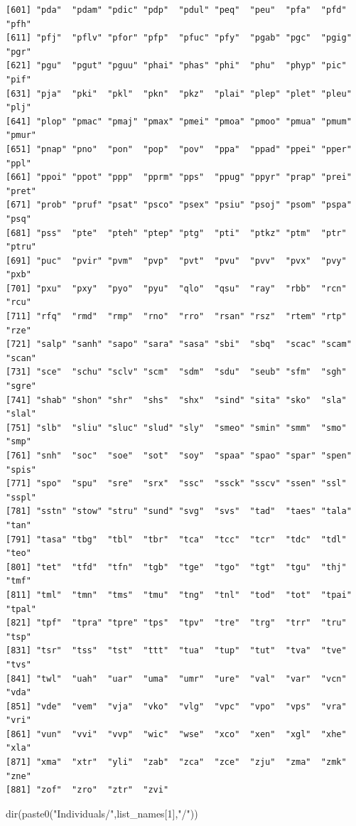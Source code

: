 \documentclass[
  letterpaper,
  DIV=11,
  numbers=noendperiod]{scrreprt}
\newenvironment{Shaded}{\begin{snugshade}}{\end{snugshade}}
\newcommand{\DecValTok}[1]{\textcolor[rgb]{0.68,0.00,0.00}{#1}}
\newcommand{\FunctionTok}[1]{\textcolor[rgb]{0.28,0.35,0.67}{#1}}
\newcommand{\NormalTok}[1]{\textcolor[rgb]{0.00,0.23,0.31}{#1}}
\newcommand{\StringTok}[1]{\textcolor[rgb]{0.13,0.47,0.30}{#1}}
\begin{document}
\begin{verbatim}
[601] "pda"  "pdam" "pdic" "pdp"  "pdul" "peq"  "peu"  "pfa"  "pfd"  "pfh" 
[611] "pfj"  "pflv" "pfor" "pfp"  "pfuc" "pfy"  "pgab" "pgc"  "pgig" "pgr" 
[621] "pgu"  "pgut" "pguu" "phai" "phas" "phi"  "phu"  "phyp" "pic"  "pif" 
[631] "pja"  "pki"  "pkl"  "pkn"  "pkz"  "plai" "plep" "plet" "pleu" "plj" 
[641] "plop" "pmac" "pmaj" "pmax" "pmei" "pmoa" "pmoo" "pmua" "pmum" "pmur"
[651] "pnap" "pno"  "pon"  "pop"  "pov"  "ppa"  "ppad" "ppei" "pper" "ppl" 
[661] "ppoi" "ppot" "ppp"  "pprm" "pps"  "ppug" "ppyr" "prap" "prei" "pret"
[671] "prob" "pruf" "psat" "psco" "psex" "psiu" "psoj" "psom" "pspa" "psq" 
[681] "pss"  "pte"  "pteh" "ptep" "ptg"  "pti"  "ptkz" "ptm"  "ptr"  "ptru"
[691] "puc"  "pvir" "pvm"  "pvp"  "pvt"  "pvu"  "pvv"  "pvx"  "pvy"  "pxb" 
[701] "pxu"  "pxy"  "pyo"  "pyu"  "qlo"  "qsu"  "ray"  "rbb"  "rcn"  "rcu" 
[711] "rfq"  "rmd"  "rmp"  "rno"  "rro"  "rsan" "rsz"  "rtem" "rtp"  "rze" 
[721] "salp" "sanh" "sapo" "sara" "sasa" "sbi"  "sbq"  "scac" "scam" "scan"
[731] "sce"  "schu" "sclv" "scm"  "sdm"  "sdu"  "seub" "sfm"  "sgh"  "sgre"
[741] "shab" "shon" "shr"  "shs"  "shx"  "sind" "sita" "sko"  "sla"  "slal"
[751] "slb"  "sliu" "sluc" "slud" "sly"  "smeo" "smin" "smm"  "smo"  "smp" 
[761] "snh"  "soc"  "soe"  "sot"  "soy"  "spaa" "spao" "spar" "spen" "spis"
[771] "spo"  "spu"  "sre"  "srx"  "ssc"  "ssck" "sscv" "ssen" "ssl"  "sspl"
[781] "sstn" "stow" "stru" "sund" "svg"  "svs"  "tad"  "taes" "tala" "tan" 
[791] "tasa" "tbg"  "tbl"  "tbr"  "tca"  "tcc"  "tcr"  "tdc"  "tdl"  "teo" 
[801] "tet"  "tfd"  "tfn"  "tgb"  "tge"  "tgo"  "tgt"  "tgu"  "thj"  "tmf" 
[811] "tml"  "tmn"  "tms"  "tmu"  "tng"  "tnl"  "tod"  "tot"  "tpai" "tpal"
[821] "tpf"  "tpra" "tpre" "tps"  "tpv"  "tre"  "trg"  "trr"  "tru"  "tsp" 
[831] "tsr"  "tss"  "tst"  "ttt"  "tua"  "tup"  "tut"  "tva"  "tve"  "tvs" 
[841] "twl"  "uah"  "uar"  "uma"  "umr"  "ure"  "val"  "var"  "vcn"  "vda" 
[851] "vde"  "vem"  "vja"  "vko"  "vlg"  "vpc"  "vpo"  "vps"  "vra"  "vri" 
[861] "vun"  "vvi"  "vvp"  "wic"  "wse"  "xco"  "xen"  "xgl"  "xhe"  "xla" 
[871] "xma"  "xtr"  "yli"  "zab"  "zca"  "zce"  "zju"  "zma"  "zmk"  "zne" 
[881] "zof"  "zro"  "ztr"  "zvi" 
\end{verbatim}

\begin{Shaded}
\begin{Highlighting}[]
\FunctionTok{dir}\NormalTok{(}\FunctionTok{paste0}\NormalTok{(}\StringTok{"Individuals/"}\NormalTok{,list\_names[}\DecValTok{1}\NormalTok{],}\StringTok{"/"}\NormalTok{))}
\end{Highlighting}
\end{Shaded}
\end{document}
